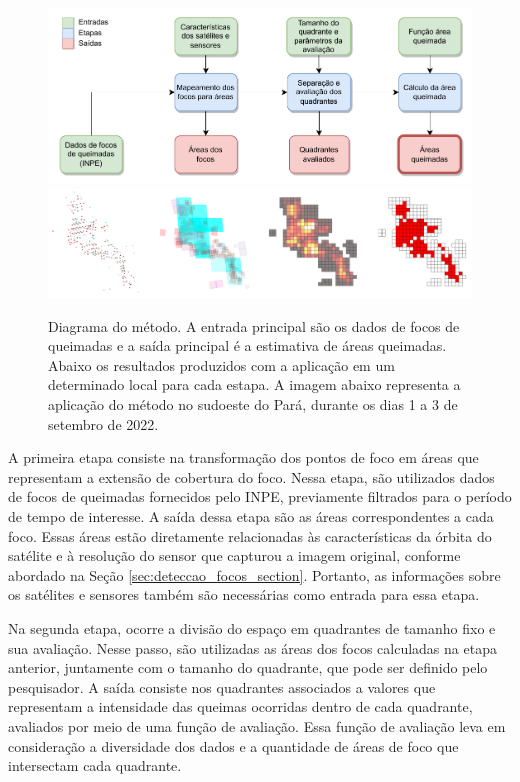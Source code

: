 \documentclass[cic,tc]{iiufrgs}
\begin{document}
\begin{figure}[!htb]
    \caption{Diagrama do método. A entrada principal são os dados de focos de queimadas e a saída principal é a estimativa de áreas queimadas. Abaixo os resultados produzidos com a aplicação em um determinado local para cada estapa. A imagem abaixo representa a aplicação do método no sudoeste do Pará, durante os dias 1 a 3 de setembro de 2022.}
    \begin{center}
        \includegraphics[width=35em]{metodologica_workflow}
        \includegraphics[width=35em]{exemplo_metodo_completo}
    \end{center}
    \label{fig:metodologica_workflow}
\end{figure}

A primeira etapa consiste na transformação dos pontos de foco em áreas que representam a extensão de cobertura do foco. Nessa etapa, são utilizados dados de focos de queimadas fornecidos pelo INPE, previamente filtrados para o período de tempo de interesse. A saída dessa etapa são as áreas correspondentes a cada foco. Essas áreas estão diretamente relacionadas às características da órbita do satélite e à resolução do sensor que capturou a imagem original, conforme abordado na Seção \ref{sec:deteccao_focos_section}. Portanto, as informações sobre os satélites e sensores também são necessárias como entrada para essa etapa.

Na segunda etapa, ocorre a divisão do espaço em quadrantes de tamanho fixo e sua avaliação. Nesse passo, são utilizadas as áreas dos focos calculadas na etapa anterior, juntamente com o tamanho do quadrante, que pode ser definido pelo pesquisador. A saída consiste nos quadrantes associados a valores que representam a intensidade das queimas ocorridas dentro de cada quadrante, avaliados por meio de uma função de avaliação. Essa função de avaliação leva em consideração a diversidade dos dados e a quantidade de áreas de foco que intersectam cada quadrante.
\end{document}
